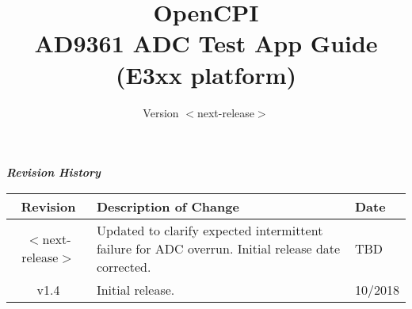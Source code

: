 \iffalse
This file is protected by Copyright. Please refer to the COPYRIGHT file
distributed with this source distribution.

This file is part of OpenCPI <http://www.opencpi.org>

OpenCPI is free software: you can redistribute it and/or modify it under the
terms of the GNU Lesser General Public License as published by the Free Software
Foundation, either version 3 of the License, or (at your option) any later
version.

OpenCPI is distributed in the hope that it will be useful, but WITHOUT ANY
WARRANTY; without even the implied warranty of MERCHANTABILITY or FITNESS FOR A
PARTICULAR PURPOSE. See the GNU Lesser General Public License for more details.

You should have received a copy of the GNU Lesser General Public License along
with this program. If not, see <http://www.gnu.org/licenses/>.
\fi

\def\docTitle{OpenCPI\\ AD9361 ADC Test App Guide (E3xx platform)}
\def\docVersion{$<$next-release$>$}

\date{Version \docVersion} %
\title{\docTitle}
\usepackage{graphicx}
\graphicspath{ {figures/} }
\usepackage{textcomp}
\usepackage{listings}


\maketitle
  \begin{center}
  \textit{\textbf{Revision History}}
    \begin{table}[H]
    \label{table:revisions} %
      \begin{tabularx}{\textwidth}{|c|X|l|}
      \hline
      \rowcolor{blue}
      \textbf{Revision} & \textbf{Description of Change} & \textbf{Date} \\
        \hline
        $<$next-release$>$ & Updated to clarify expected intermittent failure for ADC overrun. Initial release date corrected. & TBD \\
        \hline
        v1.4 & Initial release. & 10/2018 \\
        \hline
      \end{tabularx}
    \end{table}
  \end{center}

